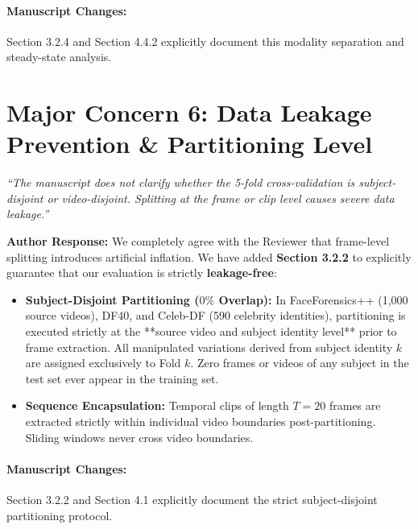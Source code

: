 \documentclass[runningheads]{llncs}
\begin{document}
\paragraph{Manuscript Changes:} Section 3.2.4 and Section 4.4.2 explicitly document this modality separation and steady-state analysis.

\bigskip

\section*{Major Concern 6: Data Leakage Prevention \& Partitioning Level}

\begin{tcolorbox}[colback=gray!10,colframe=gray!50,title=\textbf{Reviewer Comment 6}]
\textit{``The manuscript does not clarify whether the 5-fold cross-validation is subject-disjoint or video-disjoint. Splitting at the frame or clip level causes severe data leakage.''}
\end{tcolorbox}

\noindent\textbf{Author Response:} We completely agree with the Reviewer that frame-level splitting introduces artificial inflation. We have added \textbf{Section 3.2.2} to explicitly guarantee that our evaluation is strictly \textbf{leakage-free}:

\begin{itemize}
    \item \textbf{Subject-Disjoint Partitioning ($0\%$ Overlap):} In FaceForensics++ (1,000 source videos), DF40, and Celeb-DF (590 celebrity identities), partitioning is executed strictly at the **source video and subject identity level** prior to frame extraction. All manipulated variations derived from subject identity $k$ are assigned exclusively to Fold $k$. Zero frames or videos of any subject in the test set ever appear in the training set.
    \item \textbf{Sequence Encapsulation:} Temporal clips of length $T=20$ frames are extracted strictly within individual video boundaries post-partitioning. Sliding windows never cross video boundaries.
\end{itemize}

\paragraph{Manuscript Changes:} Section 3.2.2 and Section 4.1 explicitly document the strict subject-disjoint partitioning protocol.

\bigskip
\end{document}
